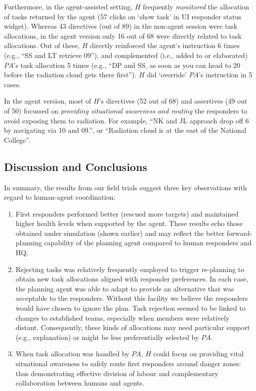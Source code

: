 Furthermore, in the agent-assisted setting, $H$ frequently \emph{monitored} the allocation of tasks  returned by the agent (57 clicks on `show task' in UI responder status widget). Whereas 43 directives (out of 89) in the non-agent session were task allocations, in the agent version only 16 out of 68 were directly related to task allocations. Out of these, $H$ directly reinforced the agent's instruction 6 times (e.g., ``SS and LT retrieve 09''), and complemented (i.e., added to or elaborated) $PA$'s task allocation 5 times (e.g., ``DP and SS, as soon as you can head to 20 before the radiation cloud gets there first''). $H$  did `override' $PA$'s instruction in 5 cases.  

In the agent version, most of $H$'s directives (52 out of 68) and assertives (49 out of 50) focussed on \textit{providing situational awareness and routing} the responders to avoid exposing them to radiation. For example, ``NK and JL approach drop off 6 by navigating via 10 and 09.'', or ``Radiation cloud is at the east of the National College''. 

\subsection{Discussion and Conclusions}
\label{sec:discussion}
In summary, the results from our field trials suggest three key observations with regard to  human-agent coordination: 
\begin{enumerate}
\item First responders performed better (rescued more targets)  and maintained higher health levels when supported by the agent.  These results echo those obtained under simulation (shown earlier) and  may reflect the better forward-planning capability of the planning agent compared to human responders and HQ. 
 
\item Rejecting tasks was relatively frequently employed to trigger re-planning to obtain new task allocations aligned with responder preferences.  In each case, the planning agent was able to adapt to provide an alternative  that was acceptable to the responders. Without this facility we believe the responders would have chosen to ignore the plan. Task rejection seemed to be linked to changes to established teams, especially when members were relatively distant. Consequently, these kinds of allocations may need particular support (e.g., explanation) or might be less preferentially selected by $PA$.

\item When task allocation was handled by $PA$, $H$ could focus on providing vital situational awareness to safely route first responders around danger zones: thus demonstrating effective division of labour and complementary collaboration between humans and agents.
\end{enumerate}

